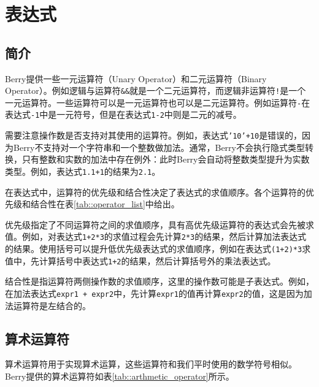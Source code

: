 \chapter{表达式}

\section{简介}

Berry提供一些一元运算符（Unary Operator）和二元运算符（Binary Operator）。例如逻辑与运算符\texttt{\&\&}就是一个二元运算符，而逻辑非运算符\texttt{!}是一个一元运算符。一些运算符可以是一元运算符也可以是二元运算符。例如运算符\texttt{-}在表达式\texttt{-1}中是一元符号，但是在表达式\texttt{1-2}中则是二元的减号。

需要注意操作数是否支持对其使用的运算符。例如，表达式\texttt{'10'+10}是错误的，因为Berry不支持对一个字符串和一个整数做加法。通常，Berry不会执行隐式类型转换，只有整数和实数的加法中存在例外：此时Berry会自动将整数类型提升为实数类型。例如，表达式\texttt{1.1+1}的结果为\texttt{2.1}。

在表达式中，运算符的优先级和结合性决定了表达式的求值顺序。各个运算符的优先级和结合性在表\ref{tab::operator_list}中给出。

优先级指定了不同运算符之间的求值顺序，具有高优先级运算符的表达式会先被求值。例如，对表达式\texttt{1+2*3}的求值过程会先计算\texttt{2*3}的结果，然后计算加法表达式的结果。使用括号可以提升低优先级表达式的求值顺序，例如在表达式\texttt{(1+2)*3}求值中，先计算括号中表达式\texttt{1+2}的结果，然后计算括号外的乘法表达式。

结合性是指运算符两侧操作数的求值顺序，这里的操作数可能是子表达式。例如，在加法表达式\texttt{expr1 + expr2}中，先计算\texttt{expr1}的值再计算\texttt{expr2}的值，这是因为加法运算符是左结合的。

\section{算术运算符}

算术运算符用于实现算术运算，这些运算符和我们平时使用的数学符号相似。Berry提供的算术运算符如表\ref{tab::arthmetic_operator}所示。


